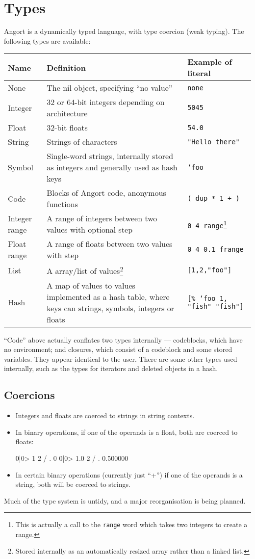 \section{Types}
Angort is a dynamically typed language, with type coercion (weak typing).
The following types are available:
\begin{center}
\begin{tabular}{|l|p{2.7in}|l|}\hline
\textbf{Name} & \textbf{Definition} & \textbf{Example of literal} \\ \hline
None & The nil object, specifying ``no value'' & \texttt{none} \\
Integer & 32 or 64-bit integers depending on architecture & \texttt{5045} \\
Float & 32-bit floats & \texttt{54.0} \\
String & Strings of characters & \texttt{"Hello there"} \\
Symbol & Single-word strings, internally stored as integers and
generally used as hash keys & \texttt{`foo} \\
Code& Blocks of Angort code, anonymous functions & \texttt{( dup * 1 + )}\\
Integer range & A range of integers between two values with optional step& \texttt{0 4 range}\footnote{This is actually a call to the \texttt{range} word which takes two integers to create a range.}\\
Float range & A range of floats between two values with  step& \texttt{0 4 0.1 frange}\\
List & A array/list of values\footnote{Stored internally as an
automatically resized array rather than a linked list.} & \texttt{[1,2,"foo"]} \\
Hash & A map of values to values implemented as a hash table, where
keys can strings, symbols, integers or floats & \texttt{[\% `foo 1, "fish" "fish"]} \\
\hline
\end{tabular}
\end{center}
``Code'' above actually conflates two types internally --- codeblocks,
which have no environment; and closures, which consist of a codeblock and
some stored variables. They appear identical to the user.
There are some other types used internally, such as the
types for iterators and deleted objects in a hash.
\clearpage
\subsection{Coercions}
\begin{itemize}
\item Integers and floats are coerced to strings in string contexts.
\item In binary operations, if one of the operands is a float, both are coerced to floats:
\begin{v}
0|0> 1 2 / .
0
0|0> 1.0 2 / .
0.500000
\end{v}
\item In certain binary operations (currently just ``+'') if one of the operands
is a string, both will be coerced to strings.
\end{itemize}
Much of the type system is untidy, and a major reorganisation is being
planned.
\clearpage

